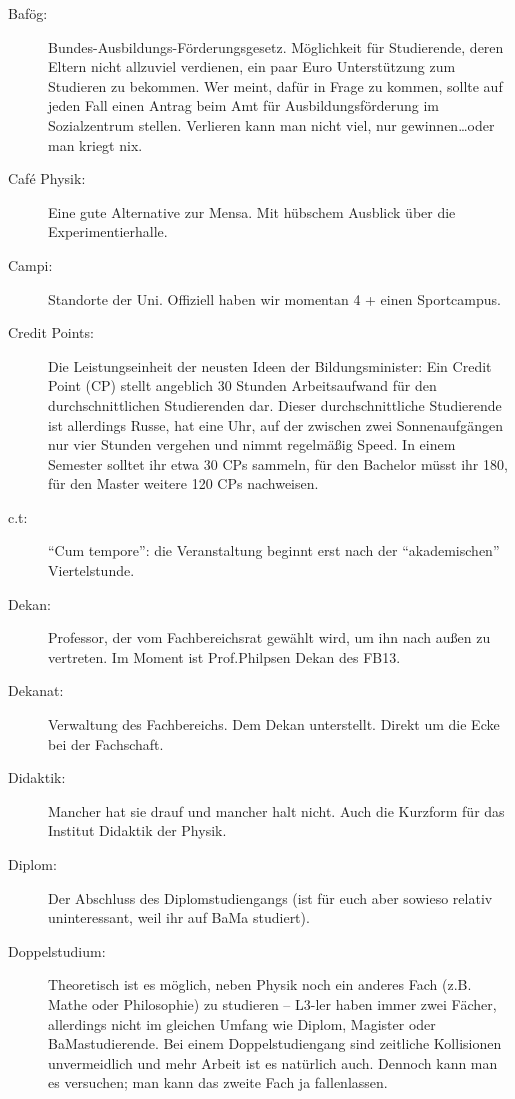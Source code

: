 \begin{description}
    \item[Bafög:]Bundes-Ausbildungs-Förderungsgesetz.
      Möglichkeit für Studierende, deren Eltern nicht allzuviel verdienen, ein paar Euro
Unterstützung zum Studieren zu bekommen.
Wer meint, dafür in Frage zu kommen, sollte auf jeden Fall einen Antrag beim Amt für
Ausbildungsförderung im Sozialzentrum stellen.
Verlieren kann man nicht viel, nur gewinnen\ldots oder man kriegt nix.

\item[Café Physik:] Eine gute Alternative zur Mensa.
  Mit hübschem Ausblick über die Experimentierhalle.

\item[Campi:] Standorte der Uni.
  Offiziell haben wir momentan 4 + einen Sportcampus.

   \item[Credit Points:] Die Leistungseinheit der neusten Ideen der Bildungsminister:
     Ein Credit Point (CP) stellt angeblich 30 Stunden Arbeitsaufwand für den durchschnittlichen Studierenden dar.
Dieser durchschnittliche Studierende ist allerdings Russe, hat eine Uhr,
auf der zwischen zwei Sonnenaufgängen nur vier Stunden vergehen und nimmt regelmäßig Speed.
In einem Semester solltet ihr etwa 30 CPs sammeln, für den Bachelor müsst ihr 180, für den
Master weitere 120 CPs nachweisen.

    \item[c.t:] \enquote{Cum tempore}: die Veranstaltung beginnt erst nach der \enquote{akademischen} Viertelstunde.

    \item[Dekan:] Professor, der vom Fachbereichsrat gewählt wird, um ihn nach außen zu vertreten.
      Im Moment ist Prof.Philpsen Dekan des FB13.

    \item[Dekanat:]Verwaltung des Fachbereichs.
      Dem Dekan unterstellt.
      Direkt um die Ecke bei der Fachschaft.

    \item[Didaktik:] Mancher hat sie drauf und mancher halt nicht.
      Auch die Kurzform für das Institut Didaktik der Physik.

    \item[Diplom:] Der Abschluss des Diplomstudiengangs (ist für euch aber sowieso relativ
uninteressant, weil ihr auf BaMa studiert).

    \item[Doppelstudium:]Theoretisch ist es möglich, neben Physik noch ein anderes Fach
(z.B. Mathe oder Philosophie) zu studieren -- L3-ler haben immer
zwei Fächer, allerdings nicht im gleichen Umfang wie Diplom,
Magister oder BaMastudierende. Bei einem Doppelstudiengang sind zeitliche
Kollisionen unvermeidlich und mehr Arbeit ist es natürlich auch.
Dennoch kann man es versuchen; man kann das zweite Fach ja
fallenlassen.


\end{description}
